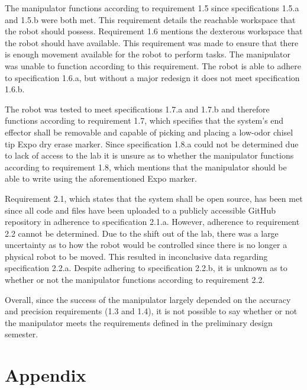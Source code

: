 The manipulator functions according to requirement 1.5 since specifications 1.5.a and 1.5.b were both met. This requirement details the reachable workspace that the robot should possess. Requirement 1.6 mentions the dexterous workspace that the robot should have available. This requirement was made to ensure that there is enough movement available for the robot to perform tasks. The manipulator was unable to function according to this requirement. The robot is able to adhere to specification 1.6.a, but without a major redesign it does not meet specification 1.6.b.

The robot was tested to meet specifications 1.7.a and 1.7.b and therefore functions according to requirement 1.7, which specifies that the system’s end effector shall be removable and capable of picking and placing a low-odor chisel tip Expo dry erase marker. Since specification 1.8.a could not be determined due to lack of access to the lab it is unsure as to whether the manipulator functions according to requirement 1.8, which mentions that the manipulator should be able to write using the aforementioned Expo marker.

Requirement 2.1, which states that the system shall be open source, has been met since all code and files have been uploaded to a publicly accessible GitHub repository in adherence to specification 2.1.a. However, adherence to requirement 2.2 cannot be determined. Due to the shift out of the lab, there was a large uncertainty as to how the robot would be controlled since there is no longer a physical robot to be moved. This resulted in inconclusive data regarding specification 2.2.a. Despite adhering to specification 2.2.b,  it is unknown as to whether or not the manipulator functions according to requirement 2.2.

Overall, since the success of the manipulator largely depended on the accuracy and precision requirements (1.3 and 1.4), it is not possible to say whether or not the manipulator meets the requirements defined in the preliminary design semester.



\null\newpage\null\newpage
% 
\appendix
\renewcommand\thesection{\Roman{section}}
\renewcommand\thesubsection{\roman{subsection}}
\section*{Appendix}\label{sec:app}




